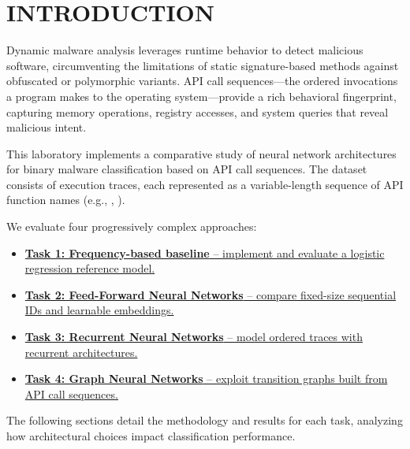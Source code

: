 
\section{INTRODUCTION} \label{sec:introduction}

    Dynamic malware analysis leverages runtime behavior to detect malicious software, circumventing the limitations of static signature-based methods against obfuscated or polymorphic variants. API call sequences---the ordered invocations a program makes to the operating system---provide a rich behavioral fingerprint, capturing memory operations, registry accesses, and system queries that reveal malicious intent.

    This laboratory implements a comparative study of neural network architectures for binary malware classification based on API call sequences. The dataset consists of execution traces, each represented as a variable-length sequence of API function names (e.g., , ).

    We evaluate four progressively complex approaches:

    \begin{itemize}
        \item \hyperref[sec:task1]{\textbf{Task 1: Frequency-based baseline} -- implement and evaluate a logistic regression reference model.}
        \item \hyperref[sec:task2]{\textbf{Task 2: Feed-Forward Neural Networks} -- compare fixed-size sequential IDs and learnable embeddings.}
        \item \hyperref[sec:task3]{\textbf{Task 3: Recurrent Neural Networks} -- model ordered traces with recurrent architectures.}
        \item \hyperref[sec:task4]{\textbf{Task 4: Graph Neural Networks} -- exploit transition graphs built from API call sequences.}
    \end{itemize}

    The following sections detail the methodology and results for each task, analyzing how architectural choices impact classification performance.
